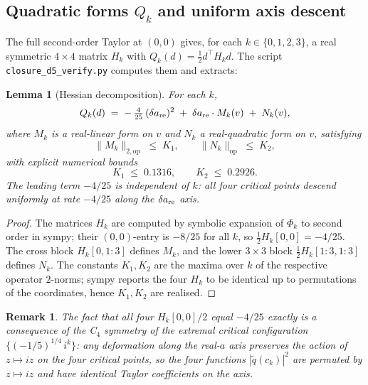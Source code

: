 \documentclass[11pt,a4paper]{article}
\newtheorem{lemma}[theorem]{Lemma}
\newtheorem{remark}[theorem]{Remark}
\begin{document}
\subsection{Quadratic forms $Q_k$ and uniform axis descent}

The full second-order Taylor at $(0,0)$ gives, for each $k\in\{0,1,2,3\}$,
a real symmetric $4\times 4$ matrix $H_k$ with $Q_k(d)=\tfrac12 d^\top
H_k d$. The script \verb|closure_d5_verify.py| computes them and
extracts:

\begin{lemma}[Hessian decomposition]\label{lem:Q-decomp}
For each $k$,
\begin{equation}
Q_k(d) \;=\; -\,\tfrac{4}{25}\,(\delta a_{\rm re})^2
\;+\; \delta a_{\rm re}\cdot M_k(v)
\;+\; N_k(v),
\label{eq:Q-decomp}
\end{equation}
where $M_k$ is a real-linear form on $v$ and $N_k$ a real-quadratic form
on $v$, satisfying
\begin{equation}
\|M_k\|_{2,\mathrm{op}} \;\le\; K_1, \qquad
\|N_k\|_{\mathrm{op}} \;\le\; K_2,
\end{equation}
with explicit numerical bounds
\begin{equation}
K_1 \;\le\; 0.1316, \qquad K_2 \;\le\; 0.2926.
\end{equation}
The leading term $-4/25$ is independent of $k$: \emph{all four critical points
descend uniformly at rate $-4/25$ along the $\delta a_{\rm re}$ axis.}
\end{lemma}

\begin{proof}
The matrices $H_k$ are computed by symbolic expansion of $\Phi_k$ to
second order in sympy; their $(0,0)$-entry is $-8/25$ for all $k$, so
$\frac12 H_k[0,0] = -4/25$. The cross block $H_k[0,1{:}3]$ defines $M_k$,
and the lower $3\times 3$ block $\frac12 H_k[1{:}3,1{:}3]$ defines
$N_k$. The constants $K_1,K_2$ are the maxima over $k$ of the
respective operator $2$-norms; sympy reports the four $H_k$ to be
identical up to permutations of the coordinates, hence $K_1,K_2$ are
realised.
\end{proof}

\begin{remark}
The fact that all four $H_k[0,0]/2$ equal $-4/25$ \emph{exactly} is a
consequence of the C${}_4$ symmetry of the extremal critical
configuration $\{(-1/5)^{1/4}\,i^k\}$: any deformation along the
real-$a$ axis preserves the action of $z\mapsto i z$ on the four
critical points, so the four functions $|\widetilde q(c_k)|^2$ are
permuted by $z\mapsto i z$ and have identical Taylor coefficients on
the axis.
\end{remark}
\end{document}
